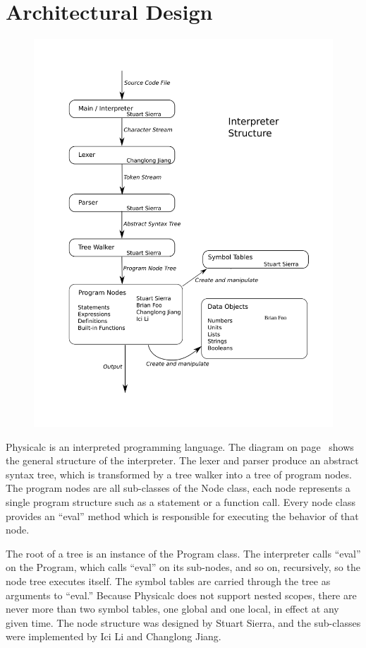 \chapter{Architectural Design}

\begin{figure}[htb!]
\centering%
\includegraphics[width=1.0\textwidth]{structure}
\label{fig:structure}
\end{figure}

Physicalc is an interpreted programming language.  The diagram on
page~\pageref{fig:structure} shows the general structure of the
interpreter.  The lexer and parser produce an abstract syntax tree,
which is transformed by a tree walker into a tree of program nodes.
The program nodes are all sub-classes of the Node class, each node
represents a single program structure such as a statement or a
function call.  Every node class provides an ``eval'' method which is
responsible for executing the behavior of that node.

The root of a tree is an instance of the Program class.  The
interpreter calls ``eval'' on the Program, which calls ``eval'' on its
sub-nodes, and so on, recursively, so the node tree executes itself.
The symbol tables are carried through the tree as arguments to
``eval.''  Because Physicalc does not support nested scopes, there are
never more than two symbol tables, one global and one local, in effect
at any given time.  The node structure was designed by Stuart Sierra,
and the sub-classes were implemented by Ici Li and Changlong Jiang.

